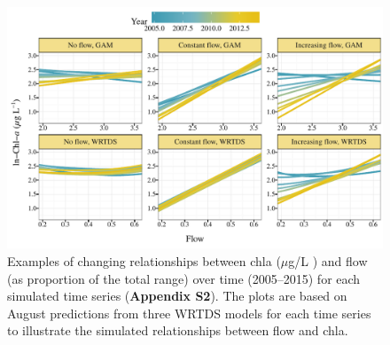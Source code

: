 \documentclass[letterpaper,12pt,oneside]{article}\usepackage[]{graphicx}\usepackage[]{color}
\makeatletter
\def\maxwidth{ %
  \ifdim\Gin@nat@width>\linewidth
    \linewidth
  \else
    \Gin@nat@width
  \fi
}
\newcommand{\mugl}{$\mu$g/L }
\makeatother
\begin{document}
\begin{figure}[!ht]

{\centering \includegraphics[width=\maxwidth]{figs/dynasim-1} 

}

\caption{Examples of changing relationships between \ac{chla} (\mugl) and flow (as proportion of the total range) over time (2005--2015) for each simulated time series ({\bf Appendix S2}).  The plots are based on August predictions from three \ac{WRTDS} models for each time series to illustrate the simulated relationships between flow and \ac{chla}.}\label{fig:dynasim}
\end{figure}
\end{document}
